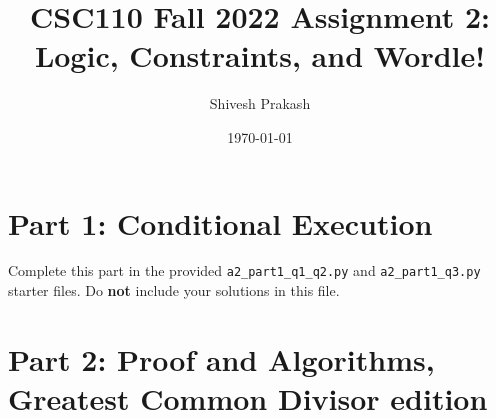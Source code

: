 \documentclass[11pt]{article}
\title{CSC110 Fall 2022 Assignment 2: Logic, Constraints, and Wordle!}
\author{Shivesh Prakash}
\date{\today}
\newcommand{\code}[1]{\texttt{#1}}
\begin{document}
\maketitle

\section*{Part 1: Conditional Execution}

Complete this part in the provided \code{a2\_part1\_q1\_q2.py} and \code{a2\_part1\_q3.py} starter files.
Do \textbf{not} include your solutions in this file.

\section*{Part 2: Proof and Algorithms, Greatest Common Divisor edition}
\end{document}

